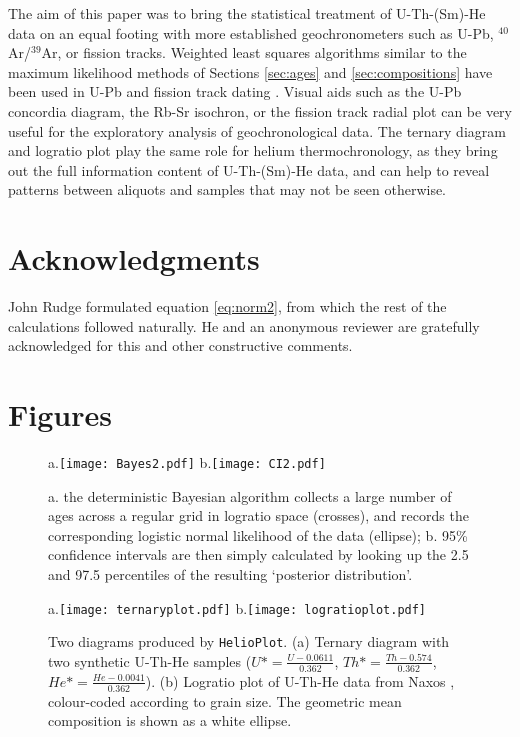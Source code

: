 \documentclass{article}
\begin{document}
The aim of this paper was to bring the statistical treatment of
U-Th-(Sm)-He data on an equal footing with more established
geochronometers such as U-Pb, $^{40}$Ar/$^{39}$Ar, or fission tracks.
Weighted least squares algorithms similar to the maximum likelihood
methods of Sections \ref{sec:ages} and \ref{sec:compositions} have
been used in U-Pb \citep{ludwig1998} and fission track dating
\citep{galbraith1990b}.  Visual aids such as the U-Pb concordia
diagram, the Rb-Sr isochron, or the fission track radial plot can be
very useful for the exploratory analysis of geochronological data. The
ternary diagram and logratio plot play the same role for helium
thermochronology, as they bring out the full information content of
U-Th-(Sm)-He data, and can help to reveal patterns between aliquots
and samples that may not be seen otherwise.

\section*{Acknowledgments}

John Rudge formulated equation \ref{eq:norm2}, from which the rest of
the calculations followed naturally. He and an anonymous reviewer are
gratefully acknowledged for this and other constructive comments.




\section*{Figures}

\begin{figure}[h]
a.\texttt{[image: Bayes2.pdf]}
b.\texttt{[image: CI2.pdf]}
\caption{a. the deterministic Bayesian algorithm collects a large
  number of ages across a regular grid in logratio space (crosses),
  and records the corresponding logistic normal likelihood of the data
  (ellipse); b.  95\% confidence intervals are then simply calculated
  by looking up the 2.5 and 97.5 percentiles of the resulting
  `posterior distribution'.}
\label{fig:ci}
\end{figure}

\begin{figure}[h]
a.\texttt{[image: ternaryplot.pdf]}
b.\texttt{[image: logratioplot.pdf]}
\caption{Two diagrams produced by {\tt HelioPlot}. (a) Ternary diagram
  with two synthetic U-Th-He samples ($U* = \frac{U-0.0611}{0.362}$,
  $Th* = \frac{Th-0.574}{0.362}$, $He* = \frac{He-0.0041}{0.362}$).
  (b) Logratio plot of U-Th-He data from Naxos \citep{vermeesch2007b},
  colour-coded according to grain size.  The geometric mean
  composition is shown as a white ellipse.}
\label{fig:helioplot}
\end{figure}
\end{document}
